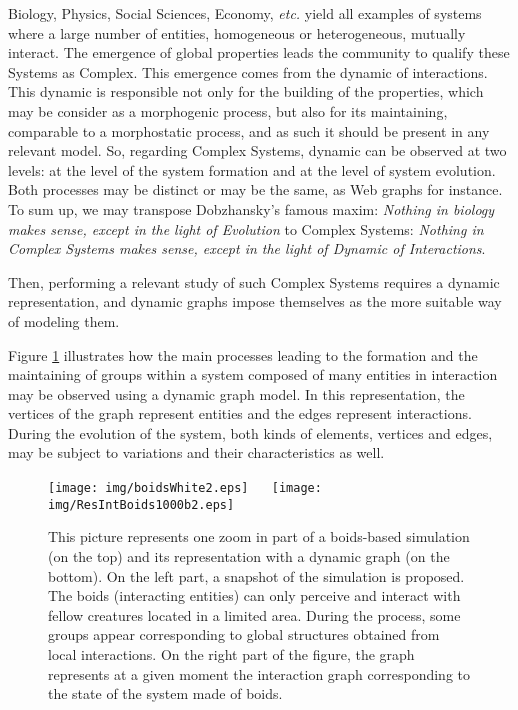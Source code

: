 \documentclass{svmult}
\begin{document}
Biology, Physics, Social Sciences, Economy, \textit{etc.} yield all examples
of systems where a large number of entities, homogeneous or heterogeneous,
mutually interact.  
The emergence of global properties leads the community to qualify these
Systems as Complex.
This emergence comes from the dynamic of interactions.
This dynamic is responsible not only for the building of the properties,
which may be consider as a morphogenic process, but also for its maintaining,
comparable to a morphostatic process, and as such it should be present in any
relevant model.   
So, regarding Complex Systems, dynamic can be observed at two levels: at the
level of the system formation and at the level of system evolution. 
Both processes may be distinct or may be the same, as Web graphs for
instance. 
To sum up, we may transpose Dobzhansky's famous maxim: 
{\em Nothing in biology makes sense, except in the light of Evolution} to Complex Systems: 
{\em Nothing in Complex Systems makes sense, except in the light of Dynamic of Interactions}.

Then, performing a relevant study of such Complex Systems requires
a dynamic representation, and dynamic graphs impose themselves as the more
suitable way of modeling them. 

Figure \ref{fig:boids} illustrates how the main processes leading to the
formation and the maintaining of groups within a system composed of many
entities in interaction may be observed using a dynamic graph model.
In this representation, the vertices of the graph represent entities and the
edges represent interactions.  
During the evolution of the system, both kinds of elements, vertices and
edges, may be subject to variations and their characteristics as well. 

\begin{figure}[h]
        \centering
                \texttt{[image: img/boidsWhite2.eps]}
                $\quad$
                \texttt{[image: img/ResIntBoids1000b2.eps]}
        \caption{This picture represents one zoom in part of a boids-based simulation (on the
                top) and its representation with a dynamic graph (on the
                bottom). 
                On the left part, a snapshot of the simulation is proposed. 
                The boids (interacting entities) can only perceive and
                interact with fellow creatures located in a limited area.
                During the process, some groups appear corresponding to global
                structures obtained from local interactions.
                On the right part of the figure, the graph represents at a
                given moment the interaction graph corresponding to the
                state of the system made of boids.}
        \label{fig:boids}
\end{figure}
\FloatBarrier
\end{document}

